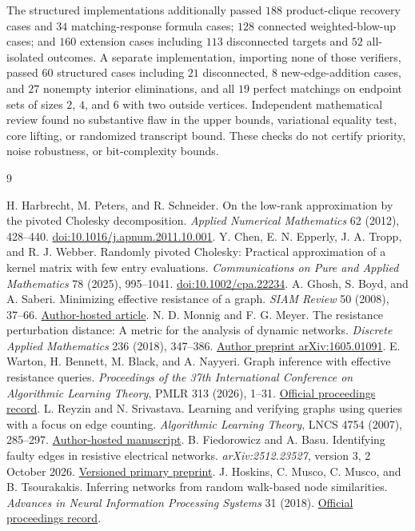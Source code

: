\documentclass[11pt,letterpaper]{article}
\begin{document}
The structured implementations additionally passed $188$ product-clique recovery cases and $34$ matching-response formula cases; $128$ connected weighted-blow-up cases; and $160$ extension cases including $113$ disconnected targets and $52$ all-isolated outcomes. A separate implementation, importing none of those verifiers, passed $60$ structured cases including $21$ disconnected, $8$ new-edge-addition cases, and $27$ nonempty interior eliminations, and all $19$ perfect matchings on endpoint sets of sizes $2$, $4$, and $6$ with two outside vertices. Independent mathematical review found no substantive flaw in the upper bounds, variational equality test, core lifting, or randomized transcript bound. These checks do not certify priority, noise robustness, or bit-complexity bounds.

\clearpage
\begin{thebibliography}{9}
\raggedright
{}
 H. Harbrecht, M. Peters, and R. Schneider.
On the low-rank approximation by the pivoted Cholesky decomposition.
\emph{Applied Numerical Mathematics} 62 (2012), 428--440.
\href{https://doi.org/10.1016/j.apnum.2011.10.001}{doi:10.1016/j.apnum.2011.10.001}.
 Y. Chen, E. N. Epperly, J. A. Tropp, and R. J. Webber.
Randomly pivoted Cholesky: Practical approximation of a kernel matrix with few entry evaluations.
\emph{Communications on Pure and Applied Mathematics} 78 (2025), 995--1041.
\href{https://doi.org/10.1002/cpa.22234}{doi:10.1002/cpa.22234}.
 A. Ghosh, S. Boyd, and A. Saberi.
Minimizing effective resistance of a graph.
\emph{SIAM Review} 50 (2008), 37--66.
\href{https://web.stanford.edu/~boyd/papers/pdf/eff_res.pdf}{Author-hosted article}.
 N. D. Monnig and F. G. Meyer.
The resistance perturbation distance: A metric for the analysis of dynamic networks.
\emph{Discrete Applied Mathematics} 236 (2018), 347--386.
\href{https://arxiv.org/abs/1605.01091}{Author preprint arXiv:1605.01091}.
 E. Warton, H. Bennett, M. Black, and A. Nayyeri.
Graph inference with effective resistance queries.
\emph{Proceedings of the 37th International Conference on Algorithmic Learning Theory}, PMLR 313 (2026), 1--31.
\href{https://proceedings.mlr.press/v313/warton26a.html}{Official proceedings record}.
 L. Reyzin and N. Srivastava.
Learning and verifying graphs using queries with a focus on edge counting.
\emph{Algorithmic Learning Theory}, LNCS 4754 (2007), 285--297.
\href{https://homepages.math.uic.edu/~lreyzin/s15_mcs590/reyzin06.pdf}{Author-hosted manuscript}.
 B. Fiedorowicz and A. Basu.
Identifying faulty edges in resistive electrical networks.
\emph{arXiv:2512.23527}, version 3, 2 October 2026.
\href{https://arxiv.org/html/2512.23527v3}{Versioned primary preprint}.
 J. Hoskins, C. Musco, C. Musco, and B. Tsourakakis.
Inferring networks from random walk-based node similarities.
\emph{Advances in Neural Information Processing Systems} 31 (2018).
\href{https://papers.neurips.cc/paper_files/paper/2018/hash/2f25f6e326adb93c5787175dda209ab6-Abstract.html}{Official proceedings record}.
\end{thebibliography}
\end{document}
